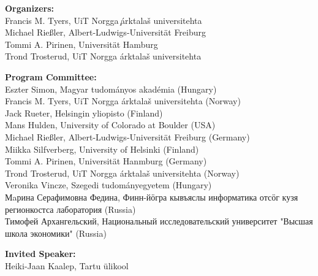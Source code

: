 \documentclass[11pt]{article}
\begin{document}

\vspace*{0.5cm}


\begin{description}
\item{\bf Organizers: }\vspace{2mm} \\
Francis M. Tyers, UiT Norgga ̧\'arktala\v{s} universitehta\\
Michael Rie\ss ler, Albert-Ludwigs-Universit\"at Freiburg\\
Tommi A. Pirinen, Universit\"at Hamburg\\
Trond Trosterud, UiT Norgga \'arktala\v{s} universitehta

\vspace{3mm}
\item{\bf Program Committee:}\vspace{2mm} \\
    Eszter Simon, Magyar tudom\'anyos akad\'emia (Hungary) \\
    Francis M. Tyers, UiT Norgga \'arktala\v{s} universitehta (Norway) \\
    Jack Rueter, Helsingin yliopisto (Finland) \\
    Mans Hulden, University of Colorado at Boulder (USA) \\
    Michael Rießler, Albert-Ludwigs-Universit\"at Freiburg (Germany) \\
    Miikka Silfverberg, University of Helsinki (Finland) \\
    Tommi A. Pirinen, Universit\"at Hanmburg (Germany) \\
    Trond Trosterud, UiT Norgga \'arktala\v{s} universitehta (Norway) \\
    Veronika Vincze, Szegedi tudom\'anyegyetem (Hungary) \\
Мaрина Серафимовна Федина, Финн-йӧгра кывъяслы информатика отсӧг кузя
    регионкостса лаборатория (Russia) \\
Тимофей Архангельский, Национальный исследовательский университет "Высшая школа
    экономики" (Russia)

\vspace{3mm}
\item{\bf Invited Speaker:}\vspace{2mm} \\
    Heiki-Jaan Kaalep, Tartu \"ulikool



\end{description}
\end{document}
